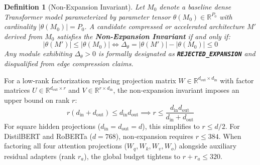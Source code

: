 \documentclass{article}
\newtheorem{definition}{Definition}
\begin{document}
\begin{definition}[Non-Expansion Invariant]
\label{def:non_expansion}
Let $M_0$ denote a baseline dense Transformer model parameterized by parameter tensor $\theta(M_0) \in \mathbb{R}^{P_0}$ with cardinality $|\theta(M_0)| = P_0$. A candidate compressed or accelerated architecture $M'$ derived from $M_0$ satisfies the \textbf{Non-Expansion Invariant} if and only if:
\begin{equation}
    |\theta(M')| \le |\theta(M_0)| \iff \Delta_\theta = |\theta(M')| - |\theta(M_0)| \le 0
\end{equation}
Any module exhibiting $\Delta_\theta > 0$ is formally designated as \textbf{\texttt{REJECTED\_EXPANSION}} and disqualified from edge compression claims.
\end{definition}

For a low-rank factorization replacing projection matrix $W \in \mathbb{R}^{d_{\text{out}} \times d_{\text{in}}}$ with factor matrices $U \in \mathbb{R}^{d_{\text{out}} \times r}$ and $V \in \mathbb{R}^{r \times d_{\text{in}}}$, the non-expansion invariant imposes an upper bound on rank $r$:
\begin{equation}
    r(d_{\text{in}} + d_{\text{out}}) \le d_{\text{in}} d_{\text{out}} \implies r \le \frac{d_{\text{in}} d_{\text{out}}}{d_{\text{in}} + d_{\text{out}}}
\end{equation}
For square hidden projections ($d_{\text{in}} = d_{\text{out}} = d$), this simplifies to $r \le d/2$. For DistilBERT and RoBERTa ($d=768$), non-expansion requires $r \le 384$. When factoring all four attention projections ($W_q, W_k, W_v, W_o$) alongside auxiliary residual adapters (rank $r_a$), the global budget tightens to $r + r_a \le 320$.
\end{document}
